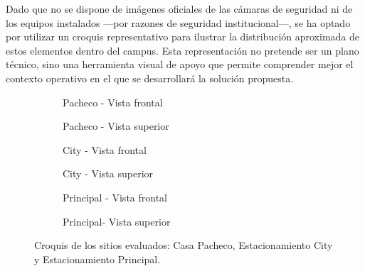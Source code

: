 Dado que no se dispone de imágenes oficiales de las cámaras de seguridad ni de los equipos instalados
---por razones de seguridad institucional---, se ha optado por utilizar un croquis representativo para ilustrar 
la distribución aproximada de estos elementos dentro del campus. Esta representación no pretende ser un plano técnico,
sino una herramienta visual de apoyo que permite comprender mejor el contexto operativo 
en el que se desarrollará la solución propuesta.

\begin{figure}[H]
    \centering
    \begin{subfigure}[t]{0.45\textwidth}
        \centering
        \caption*{Pacheco - Vista frontal}
    \end{subfigure}
    \hfill
    \begin{subfigure}[t]{0.45\textwidth}
        \centering
        \caption*{Pacheco - Vista superior}
    \end{subfigure}
    
	\vspace{1em}
	
    \begin{subfigure}[t]{0.45\textwidth}
        \centering
        \caption*{City - Vista frontal}
    \end{subfigure}
	\hfill
    \begin{subfigure}[t]{0.45\textwidth}
        \centering
        \caption*{City - Vista superior}
    \end{subfigure}
	
	\vspace{1em}

    \begin{subfigure}[t]{0.45\textwidth}
        \centering
        \caption*{Principal - Vista frontal}
    \end{subfigure}
	\hfill
    \begin{subfigure}[t]{0.45\textwidth}
        \centering
        \caption*{Principal- Vista superior}
    \end{subfigure}
    \caption{Croquis de los sitios evaluados: Casa Pacheco, Estacionamiento City y Estacionamiento Principal.}
\end{figure}

